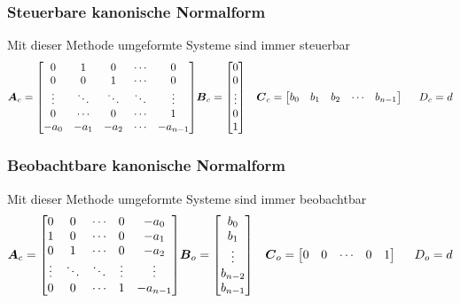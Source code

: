 \subsubsection{Steuerbare kanonische Normalform}
Mit dieser Methode umgeformte Systeme sind immer steuerbar
\begin{eqnarray} \nonumber
\boldsymbol{A}_c = 
	\begin{bmatrix}
		0 		& 1 		& 0 		&\cdots & 0\\
		0 		& 0 		& 1 		&\cdots & 0\\
		\vdots	& \ddots	& \ddots	&\ddots	& \vdots\\
		0		&\cdots		&0			&\cdots &1\\
		-a_0	&-a_1		&-a_2		&\cdots	&-a_{n-1}
	\end{bmatrix} &
\boldsymbol{B}_c = 
	\begin{bmatrix}
		0\\
		0\\
		\vdots\\
		0\\
		1
	\end{bmatrix} &
\boldsymbol{C}_c = 
	\begin{bmatrix}
		b_0	& b_1 & b_2 &\cdots &b_{n-1}	
	\end{bmatrix} \hspace{5mm}
	D_c = d
\end{eqnarray}

\subsubsection{Beobachtbare kanonische Normalform}
Mit dieser Methode umgeformte Systeme sind immer beobachtbar
\begin{eqnarray} \nonumber
\boldsymbol{A}_c = 
	\begin{bmatrix}
		0 		& 0 		& \cdots  	&0 		& -a_0\\
		1 		& 0 		& \cdots 	&0 		& -a_1\\
		0		&1			&\cdots 	&0 		& -a_2\\
		\vdots	& \ddots	& \ddots	&\vdots	& \vdots\\
		0		&0			&\cdots		&1		&-a_{n-1}
	\end{bmatrix} &
\boldsymbol{B}_o = 
		\begin{bmatrix}
		b_0\\
		b_1\\
		\vdots\\
		b_{n-2}\\
		b_{n-1}
	\end{bmatrix} &
\boldsymbol{C}_o = 
	\begin{bmatrix}
		0	& 0 & \cdots & 0 &1
	\end{bmatrix} \hspace{5mm}
D_o = d
\end{eqnarray}

